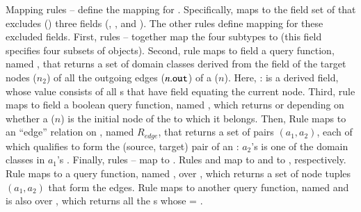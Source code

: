 Mapping rules -- define the mapping for . Specifically,  maps  to the field set of  that excludes () three fields (, , and ). 
The other rules define mapping for these excluded fields. 
%
First, rules -- together map the four  subtypes to  (this field specifies four subsets of  objects). 
%
%
Second, rule  maps to field  a query function, named , that returns a set of domain classes derived from the field  of the target nodes ($ n_2 $) of all the outgoing edges ($ n.{\tt out} $) of a  ($ n $). Here, :  is a derived field, whose value consists of all s that have field  equating the current node.
%
Third, rule  maps to field  a boolean query function, named , which returns  or  depending on whether a  ($ n $) is the initial node of the  to which it belongs. Then, Rule  maps  to an ``edge'' relation on , named $R_{edge}$, that returns a set of  pairs $ (a_1, a_2) $, each of which qualifies to form the (source, target) pair of an : $a_2$'s  is one of the domain classes in $a_1$'s .
%
Finally, rules -- map  to . Rules  and  map  to  and  to , respectively. Rule  maps  to a query function, named , over , which returns a set of node tuples $(a_1, a_2)$ that form the edges. Rule  maps  to another query function, named  and is also over , which returns all the s whose  = .

